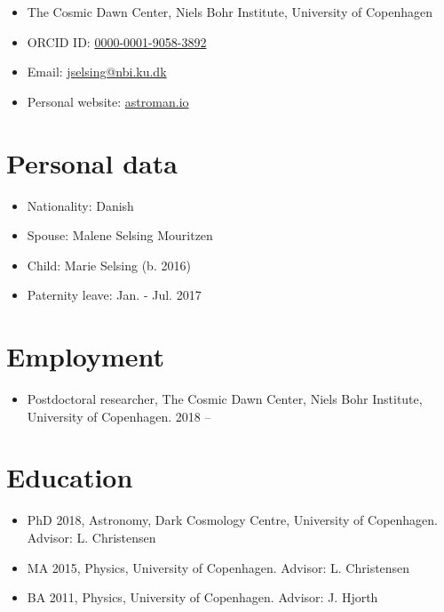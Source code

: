 \documentclass[12pt,letterpaper]{article}
\begin{document}
\thispagestyle{empty}\sloppy\sloppypar

{\huge \name}
\vspace{-0.25em}

\begin{itemize}
	\item The Cosmic Dawn Center, Niels Bohr Institute, University of Copenhagen
	\item  ORCID ID: \href{https://orcid.org/0000-0001-9058-3892}{0000-0001-9058-3892}
	\item Email: \href{mailto:jselsing@nbi.ku.dk}{jselsing@nbi.ku.dk} 
	\item Personal website: \href{http://astroman.io}{astroman.io} 
\end{itemize}



\section*{Personal data}

\begin{itemize}
	\item Nationality: Danish
	\item Spouse: Malene Selsing Mouritzen
	\item Child: Marie Selsing (b. 2016) 
	\item Paternity leave: Jan. - Jul. 2017
	
\end{itemize}


\section*{Employment}
\begin{itemize}
	\item Postdoctoral researcher, The Cosmic Dawn Center, Niels Bohr Institute, University of Copenhagen.  2018 --
\end{itemize}


\section*{Education}
	\begin{itemize}
	\item PhD 2018, Astronomy, Dark Cosmology Centre, University of Copenhagen.
		{Advisor: L. Christensen}
	\item MA 2015, Physics, University of Copenhagen.
		{Advisor: L. Christensen}
	\item BA 2011, Physics, University of Copenhagen.
		{Advisor: J. Hjorth}
	\end{itemize}
\end{document}
